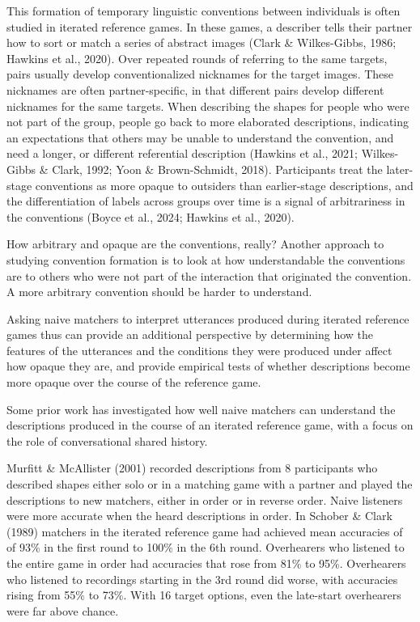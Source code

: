 \documentclass[10pt, letterpaper]{article}
\begin{document}
This formation of temporary linguistic conventions between individuals
is often studied in iterated reference games. In these games, a
describer tells their partner how to sort or match a series of abstract
images (Clark \& Wilkes-Gibbs, 1986; Hawkins et al., 2020). Over
repeated rounds of referring to the same targets, pairs usually develop
conventionalized nicknames for the target images. These nicknames are
often partner-specific, in that different pairs develop different
nicknames for the same targets. When describing the shapes for people
who were not part of the group, people go back to more elaborated
descriptions, indicating an expectations that others may be unable to
understand the convention, and need a longer, or different referential
description (Hawkins et al., 2021; Wilkes-Gibbs \& Clark, 1992; Yoon \&
Brown-Schmidt, 2018). Participants treat the later-stage conventions as
more opaque to outsiders than earlier-stage descriptions, and the
differentiation of labels across groups over time is a signal of
arbitrariness in the conventions (Boyce et al., 2024; Hawkins et al.,
2020).

How arbitrary and opaque are the conventions, really? Another approach
to studying convention formation is to look at how understandable the
conventions are to others who were not part of the interaction that
originated the convention. A more arbitrary convention should be harder
to understand.

Asking naive matchers to interpret utterances produced during iterated
reference games thus can provide an additional perspective by
determining how the features of the utterances and the conditions they
were produced under affect how opaque they are, and provide empirical
tests of whether descriptions become more opaque over the course of the
reference game.

Some prior work has investigated how well naive matchers can understand
the descriptions produced in the course of an iterated reference game,
with a focus on the role of conversational shared history.

Murfitt \& McAllister (2001) recorded descriptions from 8 participants
who described shapes either solo or in a matching game with a partner
and played the descriptions to new matchers, either in order or in
reverse order. Naive listeners were more accurate when the heard
descriptions in order. In Schober \& Clark (1989) matchers in the
iterated reference game had achieved mean accuracies of of 93\% in the
first round to 100\% in the 6th round. Overhearers who listened to the
entire game in order had accuracies that rose from 81\% to 95\%.
Overhearers who listened to recordings starting in the 3rd round did
worse, with accuracies rising from 55\% to 73\%. With 16 target options,
even the late-start overhearers were far above chance.
\end{document}
